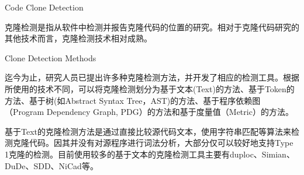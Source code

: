 
{Code Clone Detection }

克隆检测是指从软件中检测并报告克隆代码的位置的研究。相对于克隆代码研究的其他技术而言，克隆检测技术相对成熟。

{Clone Detection Methods}

迄今为止，研究人员已提出许多种克隆检测方法，并开发了相应的检测工具。根据所使用的技术不同，可以将克隆检测划分为基于文本(Text)的方法、基于Token的方法、基于树(如Abstract Syntax Tree，AST)的方法、基于程序依赖图（Program Dependency Graph, PDG）的方法和基于度量值（Metric）的方法。

基于Text的克隆检测方法是通过直接比较源代码文本，使用字符串匹配等算法来检测克隆代码。因其并没有对源程序进行词法分析，大部分仅可以较好地支持Type 1克隆的检测。目前使用较多的基于文本的克隆检测工具主要有duploc\cite{ducasse1999language}、Simian\cite{Simian}、DuDe\cite{wettel2005archeology}、SDD\cite{lee2005sdd}、NiCad\cite{roy2008nicad}等。

